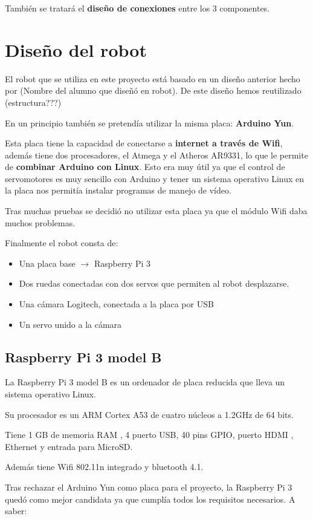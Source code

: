 \documentclass[twoside, 12pt]{epstfg}
\begin{document}
También se tratará el \textbf{diseño de conexiones} entre los 3 componentes.

\section{Diseño del robot}

El robot que se utiliza en este proyecto está basado en un diseño anterior hecho por (Nombre del alumno que diseñó en robot). De este diseño hemos reutilizado (estructura???)

En un principio también se pretendía utilizar la misma placa: \textbf{Arduino Yun}.

Esta placa tiene la capacidad de conectarse a \textbf{internet a través de Wifi}, además tiene dos procesadores, el Atmega y el Atheros AR9331, lo que le permite de \textbf{combinar Arduino con Linux}. Esto era muy útil ya que el control de servomotores es muy sencillo con Arduino y tener un sistema operativo Linux en la placa nos permitía instalar programas de manejo de vídeo.

Tras muchas pruebas se decidió no utilizar esta placa ya que el módulo Wifi daba muchos problemas.

Finalmente el robot consta de:
\begin{itemize}
	\item Una placa base $\rightarrow$ Raspberry Pi 3
	\item Dos ruedas conectadas con dos servos que permiten al robot desplazarse.
	\item Una cámara Logitech, conectada a la placa por USB
	\item Un servo unido a la cámara 
\end{itemize}




\subsection{Raspberry Pi 3 model B}
La Raspberry Pi 3 model B es un ordenador de placa reducida que lleva un sistema operativo Linux.

Su procesador es un ARM Cortex A53 de cuatro núcleos a 1.2GHz de 64 bits.

Tiene 1 GB de memoria RAM , 4 puerto USB, 40 pins GPIO, puerto HDMI , Ethernet y entrada para MicroSD.

Además tiene Wifi 802.11n integrado y bluetooth 4.1.

Tras rechazar el Arduino Yun como placa para el proyecto, la Raspberry Pi 3 quedó como mejor candidata ya que cumplía todos los requisitos necesarios. A saber:
\end{document}
